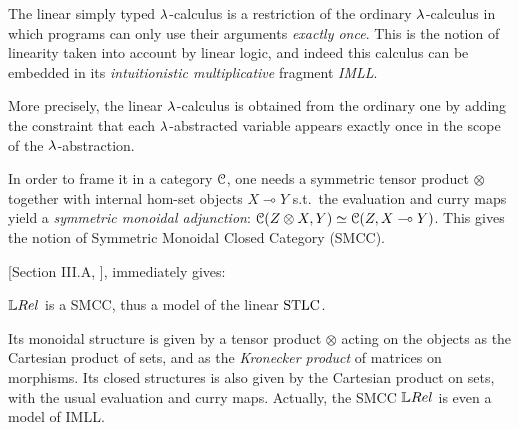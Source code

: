 The linear simply typed $\lambda$-calculus is a restriction of the ordinary $\lambda$-calculus in which programs can only use their arguments \emph{exactly once}.
This is the notion of linearity taken into account by linear logic, and indeed this calculus can be embedded in its \emph{intuitionistic multiplicative} fragment \emph{IMLL}.

More precisely, the linear $\lambda$-calculus is obtained from the ordinary one by adding the constraint that each $\lambda$-abstracted variable appears exactly once in the scope of the $\lambda$-abstraction.

In order to frame it in a category $\mathcal{C}$, one needs a symmetric tensor product $\otimes$ together with internal hom-set objects $X\multimap Y$ s.t.\ the evaluation and curry maps yield a \emph{symmetric monoidal adjunction}: $\mathcal{C}(Z\otimes X, Y) \simeq \mathcal{C} (Z, X\multimap Y)$.
This gives the notion of Symmetric Monoidal Closed Category (SMCC).

[Section III.A, \cite{Manzo2013}], immediately gives:

\begin{fact}\label{fact:LREL_SMCC}
 $\LREL$ is a SMCC, thus a model of the linear $\mathrm{STLC}$.
\end{fact}

Its monoidal structure is given by a tensor product $\otimes$ acting on the objects as the Cartesian product of sets, and as the \emph{Kronecker product}
 of matrices on morphisms.
Its closed structures is also given by the Cartesian product on sets, with the usual evaluation and curry maps.
Actually, the SMCC $\LREL$ is even a model of IMLL.
